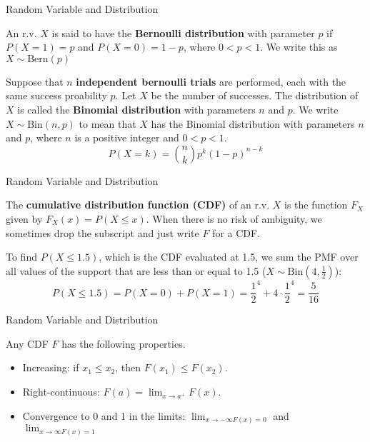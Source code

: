 \documentclass{beamer}
\newcommand{\tb}[1]{\textbf{#1}}
\begin{document}
\begin{frame}{Random Variable and Distribution}
    \begin{definition}
        An r.v. $X$ is said to have the \tb{Bernoulli distribution} with parameter $p$ if $P(X=1)=p$ and $P(X=0) = 1- p$, where $0<p<1$.
        We write this as $X \sim \text{Bern}(p)$
    \end{definition}
    \begin{definition}
        Suppose that $n$ \tb{independent bernoulli trials} are performed, each with the same success proability $p$.
        Let $X$ be the number of successes. The distribution of $X$ is called the \tb{Binomial distribution} with parameters $n$ and $p$.
        We write $X \sim \text{Bin}(n,p)$ to mean that $X$ has the Binomial distribution with parameters $n$ and $p$, where $n$ is a positive integer and $0<p<1$.
        \[
            P(X=k) = \binom{n}{k} p^k (1-p)^{n-k}
        \]

    \end{definition}
\end{frame}

\begin{frame}{Random Variable and Distribution}
    \begin{definition}
        The \tb{cumulative distribution function (CDF)} of an r.v. $X$ is the function $F_X$ given by $F_X(x) = P(X \leq x)$. When there is no risk of ambiguity, we sometimes drop the subscript and just write $F$ for a CDF.
    \end{definition}
    \begin{example}
        To find $P(X \leq 1.5)$, which is the CDF evaluated at 1.5, we sum the PMF over all values of the support that are less than or equal to 1.5 ($X \sim \text{Bin}(4, \frac{1}{2})$):
        \[
        P(X \leq 1.5) = P(X=0) + P(X=1) = \frac{1}{2}^4 + 4\cdot\frac{1}{2}^4 = \frac{5}{16}
        \]
    \end{example}
\end{frame}

\begin{frame}{Random Variable and Distribution}
    \begin{theorem}
        Any CDF $F$ has the following properties.
        \begin{itemize}
        \item{Increasing: if $x_1 \leq x_2$, then $F(x_1)\leq F(x_2)$}.
        \item {Right-continuous: $F(a) = \lim_{x \rightarrow a^+}F(x)$}.
        \item {Convergence to 0 and 1 in the limits: $\lim_{x \rightarrow -\infty F(x) = 0}$ and $\lim_{x \rightarrow \infty F(x) = 1}$}
        \end{itemize}
    \end{theorem}
\end{frame}
\end{document}
